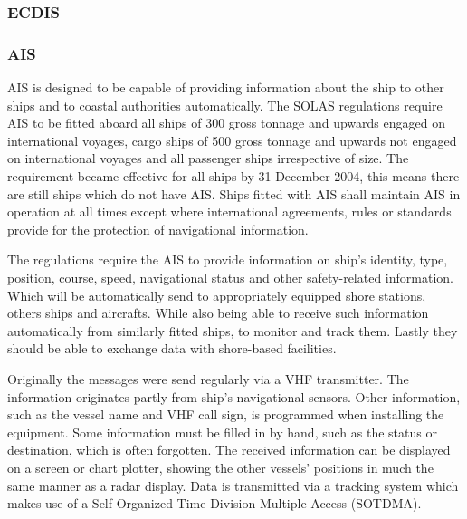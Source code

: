 \subsubsection{\acf{ECDIS}}

\subsubsection{\acf{AIS}}
\ac{AIS} is designed to be capable of providing information about the ship to other ships and to coastal authorities automatically. The \ac{SOLAS} regulations require \ac{AIS} to be fitted aboard all ships of 300 gross tonnage and upwards engaged on international voyages, cargo ships of 500 gross tonnage and upwards not engaged on international voyages and all passenger ships irrespective of size. The requirement became effective for all ships by 31 December 2004, this means there are still ships which do not have \ac{AIS}. Ships fitted with \ac{AIS} shall maintain \ac{AIS} in operation at all times except where international agreements, rules or standards provide for the protection of navigational information.

The regulations require the \ac{AIS} to provide information on ship's identity, type, position, course, speed, navigational status and other safety-related information. Which will be automatically send to appropriately equipped shore stations, others ships and aircrafts. While also being able to receive such information automatically from similarly fitted ships, to monitor and track them. Lastly they should be able to exchange data with shore-based facilities. 

Originally the messages were send regularly via a \ac{VHF} transmitter. The information originates partly from ship's navigational sensors. Other information, such as the vessel name and \ac{VHF} call sign, is programmed when installing the equipment. Some information must be filled in by hand, such as the status or destination, which is often forgotten. The received information can be displayed on a screen or chart plotter, showing the other vessels' positions in much the same manner as a radar display. Data is transmitted via a tracking system which makes use of a Self-Organized Time Division Multiple Access (SOTDMA).


